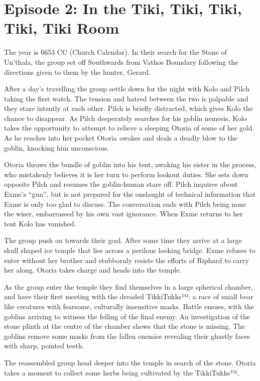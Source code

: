 \section{Episode 2: In the Tiki, Tiki, Tiki, Tiki, Tiki Room}

The year is 6653 CC (Church Calendar). In their search for the Stone of Un'thala, the group set off Southwards from Vathos Boundary following the directions given to them by the hunter, Gerard.

After a day’s travelling the group settle down for the night with Kolo and Pilch taking the first watch. The tension and hatred between the two is palpable and they stare intently at each other. Pilch is briefly distracted, which gives Kolo the chance to disappear. As Pilch desperately searches for his goblin nemesis, Kolo takes the opportunity to attempt to relieve a sleeping Otoria of some of her gold. As he reaches into her pocket Otoria awakes and deals a deadly blow to the goblin, knocking him unconscious.

Otoria throws the bundle of goblin into his tent, awaking his sister in the process, who mistakenly believes it is her turn to perform lookout duties. She sets down opposite Pilch and resumes the goblin-human stare off. Pilch inquires about Exme’s “gun”, but is not prepared for the onslaught of technical information that Exme is only too glad to discuss. The conversation ends with Pilch being none the wiser, embarrassed by his own vast ignorance. When Exme returns to her tent Kolo has vanished.

The group push on towards their goal. After some time they arrive at a large skull shaped ice temple that lies across a perilous looking bridge. Exme refuses to enter without her brother and stubbornly resists the efforts of Riphard to carry her along. Otoria takes charge and heads into the temple.

As the group enter the temple they find themselves in a large spherical chamber, and have their first meeting with the dreaded TikkiTukks™: a race of small bear like creatures with fearsome, culturally insensitive masks. Battle ensues, with the goblins arriving to witness the felling of the final enemy. An investigation of the stone plinth at the centre of the chamber shows that the stone is missing. The goblins remove some masks from the fallen enemies revealing their ghastly faces with sharp, pointed teeth.

The reassembled group head deeper into the temple in search of the stone. Otoria takes a moment to collect some herbs being cultivated by the TikkiTukks™.

